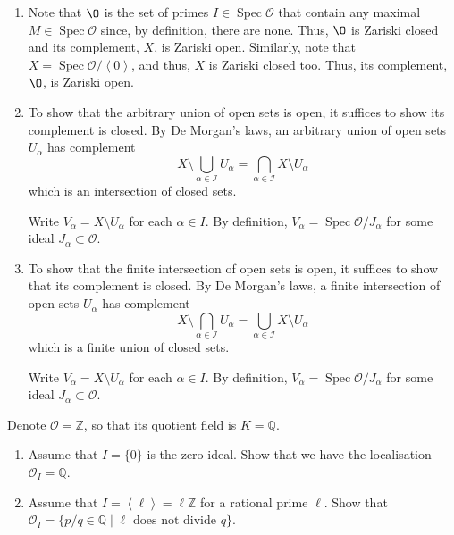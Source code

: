 \documentclass[12 pt, letterpaper]{hmcpset}
\begin{document}
\begin{solution}
	\begin{enumerate}
		\item Note that $\O$ is the set of primes $I \in \operatorname{Spec} \mathcal{O}$ that contain any maximal $M \in \operatorname{Spec} \mathcal{O}$ since, by definition, there are none. Thus, $\O$ is Zariski closed and its complement, $X$, is Zariski open.
			Similarly, note that $X = \operatorname{Spec} \mathcal{O} / \left < 0 \right >$, and thus, $X$ is Zariski closed too. Thus, its complement, $\O$, is Zariski open.
		\item To show that the arbitrary union of open sets is open, it suffices to show its complement is closed. By De Morgan's laws, an arbitrary union of open sets $U_{\alpha}$ has complement
			\[
			X \setminus \bigcup_{\alpha \in \mathcal{I}} U_{\alpha} = \bigcap_{\alpha \in \mathcal{I}} X \setminus U_{\alpha}
			\]
			which is an intersection of closed sets.

			Write $V_{\alpha} = X \setminus U_{\alpha}$ for each $\alpha \in I$. By definition, $V_{\alpha} = \operatorname{Spec} \mathcal{O} / J_{\alpha}$ for some ideal $J_{\alpha} \subset \mathcal{O}$. 
		\item To show that the finite intersection of open sets is open, it suffices to show that its complement is closed. By De Morgan's laws, a finite intersection of open sets $U_{\alpha}$ has complement
			\[
				X \setminus \bigcap_{\alpha \in \mathcal{I}} U_{\alpha} = \bigcup_{\alpha \in \mathcal{I}} X \setminus U_{\alpha}
			\]
			which is a finite union of closed sets.

			Write $V_{\alpha} = X \setminus U_{\alpha}$ for each $\alpha \in I$. By definition, $V_{\alpha} = \operatorname{Spec} \mathcal{O} / J_{\alpha}$ for some ideal $J_{\alpha} \subset \mathcal{O}$.
	\end{enumerate}
\end{solution}

\pagebreak

\begin{problem}[Problem 2.]
	Denote $\mathcal{O} = \mathbb{Z}$, so that its quotient field is $K = \mathbb{Q}$.
	\begin{enumerate}
		\item Assume that $I = \{ 0 \}$ is the zero ideal. Show that we have the localisation $\mathcal{O}_{I} = \mathbb{Q}$.
		\item Assume that $I = \left < \ell \right > = \ell \mathbb{Z}$ for a rational prime $\ell$. Show that $\mathcal{O}_{I} = \{ p / q \in \mathbb{Q} \mid \ell \text{ does not divide } q \}$.
	\end{enumerate}
\end{problem}
\end{document}
